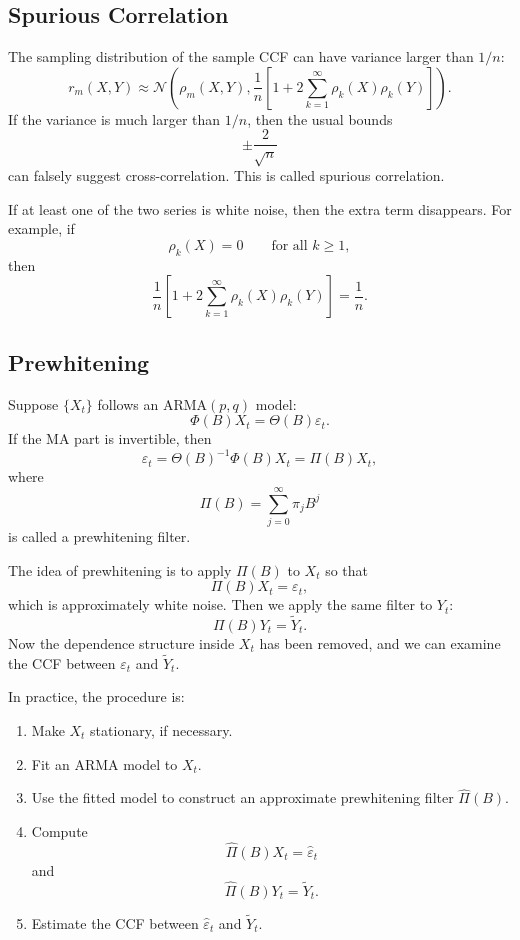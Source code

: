 \documentclass[12pt,oneside]{book}
\numberwithin{equation}{section}
\theoremstyle{definition}
\theoremstyle{plain}
\theoremstyle{remark}
\newcommand{\Normal}{\mathcal{N}}
\begin{document}
\subsection{Spurious Correlation}

The sampling distribution of the sample CCF can have variance larger than $1/n$:
\[
r_m(X,Y)
\approx
\Normal\left(
\rho_m(X,Y),
\frac{1}{n}
\left[
1+2\sum_{k=1}^{\infty}\rho_k(X)\rho_k(Y)
\right]
\right).
\]
If the variance is much larger than $1/n$, then the usual bounds
\[
\pm \frac{2}{\sqrt{n}}
\]
can falsely suggest cross-correlation. This is called spurious correlation.

If at least one of the two series is white noise, then the extra term disappears. For example, if
\[
\rho_k(X)=0
\qquad
\text{for all } k\geq 1,
\]
then
\[
\frac{1}{n}
\left[
1+2\sum_{k=1}^{\infty}\rho_k(X)\rho_k(Y)
\right]
=
\frac{1}{n}.
\]

\subsection{Prewhitening}

Suppose $\{X_t\}$ follows an ARMA$(p,q)$ model:
\[
\Phi(B)X_t=\Theta(B)\varepsilon_t.
\]
If the MA part is invertible, then
\[
\varepsilon_t
=
\Theta(B)^{-1}\Phi(B)X_t
=
\Pi(B)X_t,
\]
where
\[
\Pi(B)=\sum_{j=0}^{\infty}\pi_jB^j
\]
is called a prewhitening filter.

The idea of prewhitening is to apply $\Pi(B)$ to $X_t$ so that
\[
\Pi(B)X_t=\varepsilon_t,
\]
which is approximately white noise. Then we apply the same filter to $Y_t$:
\[
\Pi(B)Y_t=\widetilde{Y}_t.
\]
Now the dependence structure inside $X_t$ has been removed, and we can examine the CCF between $\varepsilon_t$ and $\widetilde{Y}_t$.

In practice, the procedure is:

\begin{enumerate}
\item Make $X_t$ stationary, if necessary.
\item Fit an ARMA model to $X_t$.
\item Use the fitted model to construct an approximate prewhitening filter $\widehat{\Pi}(B)$.
\item Compute
\[
\widehat{\Pi}(B)X_t=\widehat{\varepsilon}_t
\]
and
\[
\widehat{\Pi}(B)Y_t=\widetilde{Y}_t.
\]
\item Estimate the CCF between $\widehat{\varepsilon}_t$ and $\widetilde{Y}_t$.
\end{enumerate}
\end{document}
